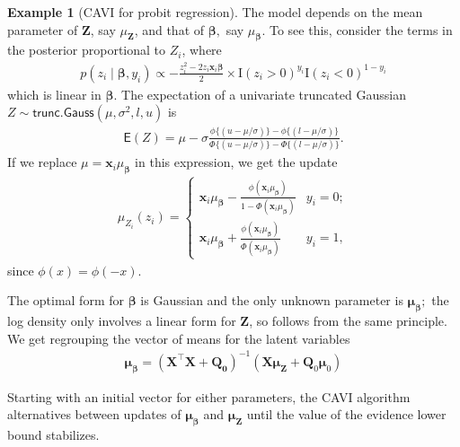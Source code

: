 \documentclass[
  11pt,
  letterpaper,
]{scrbook}
\theoremstyle{definition}
\newtheorem{example}{Example}[chapter]
\theoremstyle{plain}
\theoremstyle{plain}
\theoremstyle{plain}
\theoremstyle{definition}
\theoremstyle{definition}
\theoremstyle{plain}
\theoremstyle{plain}
\theoremstyle{remark}
\begin{document}
\begin{example}[CAVI for probit
regression]
The model depends on the mean parameter of \(\boldsymbol{Z}\), say
\(\mu_{\boldsymbol{Z}}\), and that of \(\boldsymbol{\beta},\) say
\(\mu_{\boldsymbol{\beta}}.\) To see this, consider the terms in the
posterior proportional to \(Z_i\), where \begin{align*}
p(z_i \mid \boldsymbol{\beta}, y_i) \propto -\frac{z_i^2 - 2z_i \mathbf{x}_i\boldsymbol{\beta}}{2} \times \mathrm{I}(z_i >0)^{y_i}\mathrm{I}(z_i <0)^{1-y_i}
\end{align*} which is linear in \(\boldsymbol{\beta}\). The expectation
of a univariate truncated Gaussian
\(Z \sim \mathsf{trunc. Gauss}(\mu,\sigma^2, l, u)\) is \begin{align*}
\mathsf{E}(Z) = \mu - \sigma\frac{\phi\{(u-\mu/\sigma)\} - \phi\{(l-\mu/\sigma)\}}{\Phi\{(u-\mu/\sigma)\} - \Phi\{(l-\mu/\sigma)\}}.
\end{align*} If we replace \(\mu=\mathbf{x}_i\mu_{\boldsymbol{\beta}}\)
in this expression, we get the update \begin{align*}
\mu_{Z_i}(z_i) = \begin{cases}
\mathbf{x}_i\mu_{\boldsymbol{\beta}} - \frac{ \phi(\mathbf{x}_i\mu_{\boldsymbol{\beta}})}{1-\Phi(\mathbf{x}_i\mu_{\boldsymbol{\beta}})} & y_i = 0;\\
\mathbf{x}_i\mu_{\boldsymbol{\beta}} + \frac{ \phi(\mathbf{x}_i\mu_{\boldsymbol{\beta}})}{\Phi(\mathbf{x}_i\mu_{\boldsymbol{\beta}})} & y_i = 1,
\end{cases}
\end{align*} since \(\phi(x)=\phi(-x).\)

The optimal form for \(\boldsymbol{\beta}\) is Gaussian and the only
unknown parameter is \(\boldsymbol{\mu}_{\boldsymbol{\beta}};\) the log
density only involves a linear form for \(\boldsymbol{Z}\), so follows
from the same principle. We get regrouping the vector of means for the
latent variables \begin{align*}
\boldsymbol{\mu}_{\boldsymbol{\beta}} = (\mathbf{X}^\top\mathbf{X} + \mathbf{Q_0})^{-1}(\mathbf{X}\boldsymbol{\mu}_{\boldsymbol{Z}} + \mathbf{Q}_0\boldsymbol{\mu}_0)
\end{align*}

Starting with an initial vector for either parameters, the CAVI
algorithm alternatives between updates of
\(\boldsymbol{\mu}_{\boldsymbol{\beta}}\) and
\(\boldsymbol{\mu}_{\boldsymbol{Z}}\) until the value of the evidence
lower bound stabilizes.


\end{example}
\end{document}
